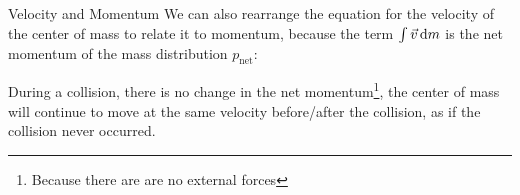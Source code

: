 \documentclass[12pt,compress,aspectratio=169]{beamer}
\begin{document}
\begin{frame}{Velocity and Momentum}
  We can also rearrange the equation for the velocity of the center of mass to
  relate it to momentum, because the term $\int\vec v\dl m$ is the net momentum
  of the mass distribution $p_\text{net}$:
  

  During a collision, there is no change in the net momentum\footnote{Because
  there are are no external forces}, the center of mass will continue to move
  at the same velocity before/after the collision, as if the collision never
  occurred.
\end{frame}
\end{document}
